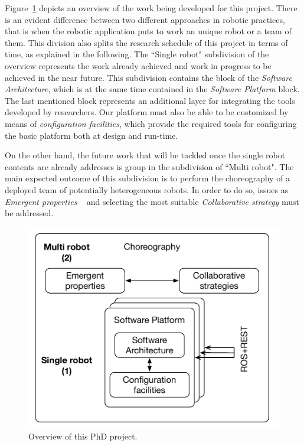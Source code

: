 Figure~\ref{fig:overview} depicts an overview of the work being developed for this project.
There is an evident difference between two different approaches in robotic practices, that is when the robotic application puts to work an unique robot or a team of them. 
This division also splits the research schedule of this project in terms of time, as explained in the following.
The ``Single robot" subdivision of the overview represents the work already achieved and work in progress to be achieved in the near future.
This subdivision contains the block of the \emph{Software Architecture}, which is at the same time contained in the \emph{Software Platform} block.
The last mentioned block represents an additional layer for integrating the tools developed by researchers.
Our platform must also be able to be customized by means of \emph{configuration facilities}, which provide the required tools for configuring the basic platform both at design and run-time.

On the other hand, the future work that will be tackled once the single robot contents are already addresses is group in the subdivision of ``Multi robot".
The main expected outcome of this subdivision is to perform the choreography of a deployed team of potentially heterogeneous robots.
In order to do so, issues as \emph{Emergent properties} ~\cite{DeAngelis2015,DeAngelis2016} and selecting the most suitable \emph{Collaborative strategy}  must be addressed.

\begin{figure}[!t]
\begin{center}
\includegraphics[width=1\linewidth]{Figures/researchv2.pdf}
\caption{Overview of this PhD project.}
\label{fig:overview}
\end{center}
\end{figure}

